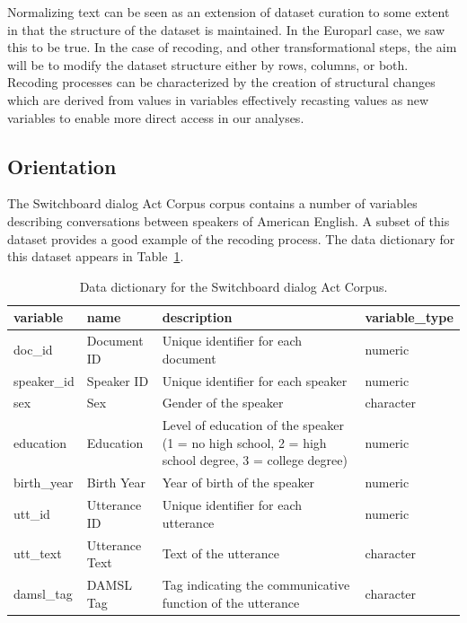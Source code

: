 \documentclass[
  letterpaper,
  DIV=11,
  numbers=noendperiod]{scrreport}
\theoremstyle{definition}
\theoremstyle{remark}
\begin{document}
Normalizing text can be seen as an extension of dataset curation to some
extent in that the structure of the dataset is maintained. In the
Europarl case, we saw this to be true. In the case of recoding, and
other transformational steps, the aim will be to modify the dataset
structure either by rows, columns, or both. Recoding processes can be
characterized by the creation of structural changes which are derived
from values in variables effectively recasting values as new variables
to enable more direct access in our analyses.

\hypertarget{sec-td-recoding-orientation}{%
\subsection{Orientation}\label{sec-td-recoding-orientation}}

The Switchboard dialog Act Corpus corpus contains a number of variables
describing conversations between speakers of American English. A subset
of this dataset provides a good example of the recoding process. The
data dictionary for this dataset appears in
Table~\ref{tbl-td-swda-curated-dd}.

\hypertarget{tbl-td-swda-curated-dd}{}
\begin{table}
\caption{\label{tbl-td-swda-curated-dd}Data dictionary for the Switchboard dialog Act Corpus. }\tabularnewline

\centering
\begin{tabular}{l|l|l|l}
\hline
variable & name & description & variable\_type\\
\hline
doc\_id & Document ID & Unique identifier for each document & numeric\\
\hline
speaker\_id & Speaker ID & Unique identifier for each speaker & numeric\\
\hline
sex & Sex & Gender of the speaker & character\\
\hline
education & Education & Level of education of the speaker (1 = no high school, 2 = high school degree, 3 = college degree) & numeric\\
\hline
birth\_year & Birth Year & Year of birth of the speaker & numeric\\
\hline
utt\_id & Utterance ID & Unique identifier for each utterance & numeric\\
\hline
utt\_text & Utterance Text & Text of the utterance & character\\
\hline
damsl\_tag & DAMSL Tag & Tag indicating the communicative function of the utterance & character\\
\hline
\end{tabular}
\end{table}
\end{document}
